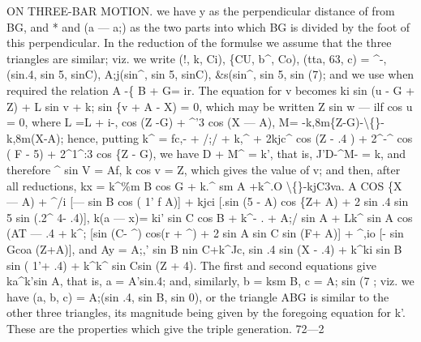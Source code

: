 \documentclass[11pt,a4paper]{book}
\begin{document}
ON THREE-BAR MOTION.
we
have
y
as
the
perpendicular
distance
of
from
BG,
and
*
and
(a --- a;)
as
the
two
parts
into which BG
is divided by the
foot
of
this perpendicular.
In
the reduction
of the formulse we assume
that the three
triangles are similar;
viz. we
write
(\guillemotleft{}!, k,
Ci),
\{CU,
b\textasciicircum{},
Co),
(tta,
63, c)
= \textasciicircum{}-, (sin.4,
sin 5, sinC), A;j(sin\textasciicircum{}, sin 5, sinC), \&s(sin\textasciicircum{},
sin 5, sin (7);
and we use when required
the
relation A -\{ B + G= ir.
The equation
for
v becomes
ki sin (u - G + Z) + L sin v + k; sin \{v + A - X) = 0,
which may be written
Z sin w --- ilf cos u = 0,
where
L =L + i-, cos (Z -G) + \textasciicircum{}'3 cos (X --- A),
M=
-k,8m\{Z-G)-\textbackslash\{\}-k,8m(X-A);
hence, putting
k\textasciicircum{} = fc,- + /;/ + k,\textasciicircum{} + 2kjc\textasciicircum{} cos (Z - .4 ) + 2\textasciicircum{}-\textasciicircum{} cos ( F - 5) + 2\textasciicircum{}1\textasciicircum{}:3 cos \{Z - G),
we have D + M\textasciicircum{} = k', that
is, \textbullet{}J'D-\textasciicircum{}M- = k, and therefore
\textasciicircum{} sin V = Af,
k cos v = Z,
which gives the
value of v;
and
then,
after
all
reductions,
kx = k\textasciicircum{}\%m B cos G + k.\textasciicircum{} sm A +k\textasciicircum{}.O \textbackslash\{\}-kjC3\guillemotright{}va. A COS \{X --- A)
+ \textasciicircum{}/i [--- sin B cos ( 1' f A)]
+ kjci [.sin (5 - A) cos \{Z+ A) + 2 sin .4 sin 5 sin (.2\textasciicircum{} 4- .4)],
k(a --- x)= ki' sin C cos B + k\textasciicircum{}-
.
+ A;/ sin A + Lk\textasciicircum{} sin A cos (AT --- .4
+ k\textasciicircum{}; [sin (C- \textasciicircum{}) cos(r + \textasciicircum{}) + 2 sin A sin C sin (F+ A)]
+ \textasciicircum{},io [- sin Gcoa (Z+A)],
and
Ay = A;,' sin B nin C+k\textasciicircum{}Jc, sin .4 sin (X - .4) + k\textasciicircum{}ki sin B sin ( 1'+ .4) + k\textasciicircum{}k\textasciicircum{} sin Csin (Z + 4).
The
first and second equations give ka\textasciicircum{}k'sin A, that
is, a = A'sin.4;
and,
similarly,
b = ksm B,
c = A; sin (7 ;
viz. we have
(a,
b,
c) = A;(sin .4,
sin B,
sin 0),
or
the
triangle ABG
is
similar
to the other three
triangles,
its magnitude being given
by
the
foregoing
equation
for
k'.
These
are
the
properties
which
give
the
triple
generation.
72---2
\end{document}
